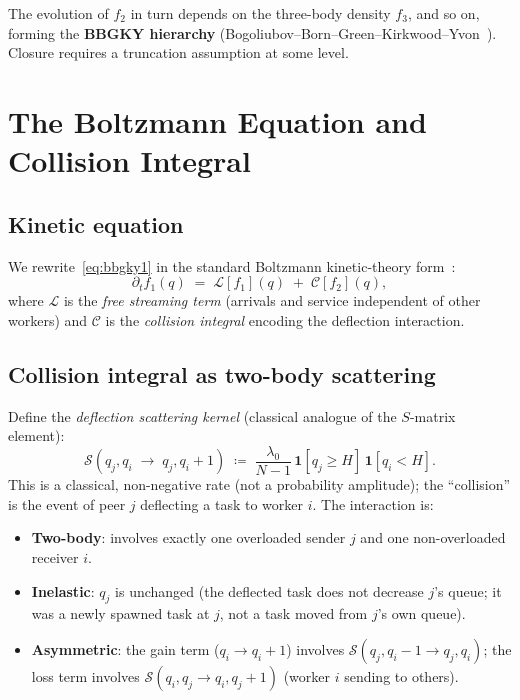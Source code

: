 \documentclass[11pt,a4paper]{report}
\newcommand{\fone}{f_1}
\newcommand{\ftwo}{f_2}
\newcommand{\cC}{\mathcal{C}}
\newcommand{\cL}{\mathcal{L}}
\newcommand{\cS}{\mathcal{S}}
\begin{document}
The evolution of $\ftwo$ in turn depends on the three-body density $f_3$,
and so on, forming the \textbf{BBGKY hierarchy}
(Bogoliubov--Born--Green--Kirkwood--Yvon~\cite{bogoliubov1946,born_green1949,kirkwood1946,yvon1935}).  Closure requires a truncation
assumption at some level.

\section{The Boltzmann Equation and Collision Integral}

\subsection{Kinetic equation}

We rewrite~\eqref{eq:bbgky1} in the standard Boltzmann kinetic-theory form~\cite{boltzmann1872,cercignani1988}:
\begin{equation}
  \partial_t \fone(q) \;=\; \cL[\fone](q) \;+\; \cC[\ftwo](q),
  \label{eq:boltzmann}
\end{equation}
where $\cL$ is the \emph{free streaming term} (arrivals and service independent
of other workers) and $\cC$ is the \emph{collision integral} encoding the
deflection interaction.

\subsection{Collision integral as two-body scattering}

Define the \emph{deflection scattering kernel}
(classical analogue of the $S$-matrix element):
\begin{equation}
  \cS(q_j, q_i \;\to\; q_j, q_i + 1)
  \;\coloneqq\;
  \frac{\lambda_0}{N-1}\,
  \mathbf{1}[q_j \geq H]\,\mathbf{1}[q_i < H].
  \label{eq:smatrix}
\end{equation}
This is a classical, non-negative rate (not a probability amplitude);
the ``collision'' is the event of peer $j$ deflecting a task to worker $i$.
The interaction is:
\begin{itemize}
  \item \textbf{Two-body}: involves exactly one overloaded sender $j$ and
        one non-overloaded receiver $i$.
  \item \textbf{Inelastic}: $q_j$ is unchanged (the deflected task does not
        decrease $j$'s queue; it was a newly spawned task at $j$,
        not a task moved from $j$'s own queue).
  \item \textbf{Asymmetric}: the gain term ($q_i \to q_i+1$) involves
        $\cS(q_j, q_i-1 \to q_j, q_i)$; the loss term involves
        $\cS(q_i, q_j \to q_i, q_j+1)$ (worker $i$ sending to others).
\end{itemize}
\end{document}
